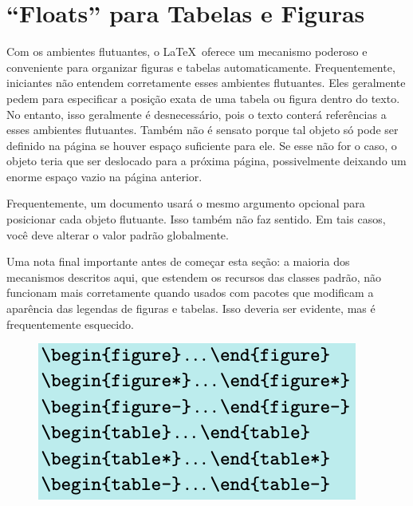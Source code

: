 \chapter{``Floats'' para Tabelas e Figuras}
Com os ambientes flutuantes, o \LaTeX\ oferece um mecanismo poderoso e conveniente para organizar figuras e tabelas automaticamente. Frequentemente, iniciantes não entendem corretamente esses ambientes flutuantes. Eles geralmente pedem para especificar a posição exata de uma tabela ou figura dentro do texto. No entanto, isso geralmente é desnecessário, pois o texto conterá referências a esses ambientes flutuantes. Também não é sensato porque tal objeto só pode ser definido na página se houver espaço suficiente para ele. Se esse não for o caso, o objeto teria que ser deslocado para a próxima página, possivelmente deixando um enorme espaço vazio na página anterior.

Frequentemente, um documento usará o mesmo argumento opcional para posicionar cada objeto flutuante. Isso também não faz sentido. Em tais casos, você deve alterar o valor padrão globalmente.

Uma nota final importante antes de começar esta seção: a maioria dos mecanismos descritos aqui, que estendem os recursos das classes padrão, não funcionam mais corretamente quando usados com pacotes que modificam a aparência das legendas de figuras e tabelas. Isso deveria ser evidente, mas é frequentemente esquecido.

\begin{figure}[h]
    \centering
    \includegraphics[width=0.5\linewidth]{imagens/imagem24.png}
\end{figure}